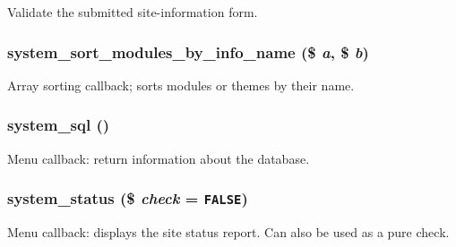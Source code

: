 Validate the submitted site-information form. \hypertarget{system_8admin_8inc_ff1678b51b0d78a4c27b8e05b4f6621b}{
\subsubsection[{system\_\-sort\_\-modules\_\-by\_\-info\_\-name}]{\setlength{\rightskip}{0pt plus 5cm}system\_\-sort\_\-modules\_\-by\_\-info\_\-name (\$ {\em a}, \/  \$ {\em b})}}
\label{system_8admin_8inc_ff1678b51b0d78a4c27b8e05b4f6621b}


Array sorting callback; sorts modules or themes by their name. \hypertarget{system_8admin_8inc_81c56302e4a550285499e49db324c98f}{
\subsubsection[{system\_\-sql}]{\setlength{\rightskip}{0pt plus 5cm}system\_\-sql ()}}
\label{system_8admin_8inc_81c56302e4a550285499e49db324c98f}


Menu callback: return information about the database. \hypertarget{system_8admin_8inc_d24845c53f23e750918d3b1678bda951}{
\subsubsection[{system\_\-status}]{\setlength{\rightskip}{0pt plus 5cm}system\_\-status (\$ {\em check} = {\tt FALSE})}}
\label{system_8admin_8inc_d24845c53f23e750918d3b1678bda951}


Menu callback: displays the site status report. Can also be used as a pure check.

